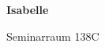 \documentclass[a4paper]{article}
\begin{document}
\printGenericVSLHeader
\begin{center}
\begin{vsltext}{3cm}{4cm}

   \vspace{0.5cm} 

    \textbf{Isabelle} 

    \vspace{1.5cm}

    Seminarraum 138C

\end{vsltext}

\end{center}
\end{document}
